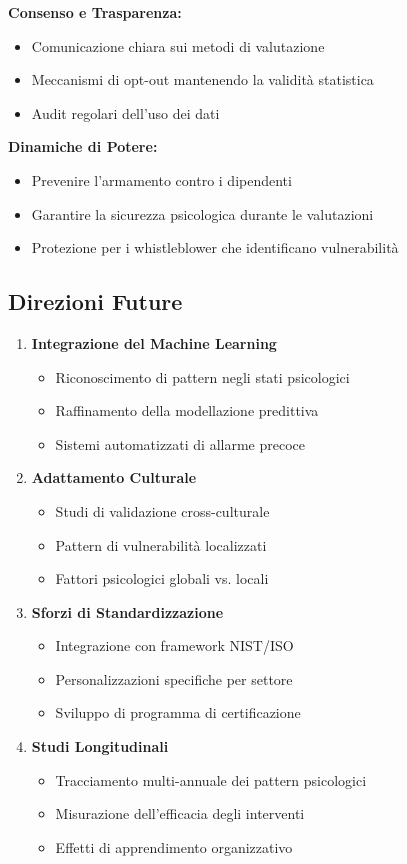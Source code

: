 \documentclass[11pt,a4paper]{article}
\begin{document}
\textbf{Consenso e Trasparenza:}
\begin{itemize}
\item Comunicazione chiara sui metodi di valutazione
\item Meccanismi di opt-out mantenendo la validità statistica
\item Audit regolari dell'uso dei dati
\end{itemize}

\textbf{Dinamiche di Potere:}
\begin{itemize}
\item Prevenire l'armamento contro i dipendenti
\item Garantire la sicurezza psicologica durante le valutazioni
\item Protezione per i whistleblower che identificano vulnerabilità
\end{itemize}

\subsection{Direzioni Future}

\begin{enumerate}
\item \textbf{Integrazione del Machine Learning}
   \begin{itemize}
   \item Riconoscimento di pattern negli stati psicologici
   \item Raffinamento della modellazione predittiva
   \item Sistemi automatizzati di allarme precoce
   \end{itemize}

\item \textbf{Adattamento Culturale}
   \begin{itemize}
   \item Studi di validazione cross-culturale
   \item Pattern di vulnerabilità localizzati
   \item Fattori psicologici globali vs. locali
   \end{itemize}

\item \textbf{Sforzi di Standardizzazione}
   \begin{itemize}
   \item Integrazione con framework NIST/ISO
   \item Personalizzazioni specifiche per settore
   \item Sviluppo di programma di certificazione
   \end{itemize}

\item \textbf{Studi Longitudinali}
   \begin{itemize}
   \item Tracciamento multi-annuale dei pattern psicologici
   \item Misurazione dell'efficacia degli interventi
   \item Effetti di apprendimento organizzativo
   \end{itemize}
\end{enumerate}
\end{document}
